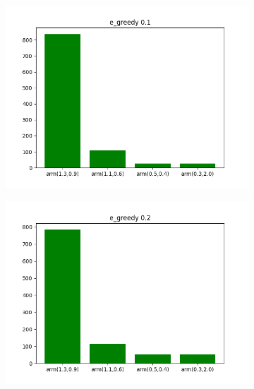 \documentclass[letterpaper]{article}
\begin{document}
\begin{figure}[H]
\begin{subfigure}{.5\textwidth}
    \includegraphics[width=1\linewidth]{images/assign3/ex1/arms_e_greedy01}
    \caption{}
    \label{fig:arms_e_greedy01_ex1}
  \end{subfigure}
  \begin{subfigure}{.5\textwidth}
    \centering
    \includegraphics[width=1\linewidth]{images/assign3/ex1/arms_e_greedy02}
    \caption{}
    \label{fig:arms_e_greedy02_ex1}
  \end{subfigure}
  \begin{subfigure}{.5\textwidth}
    \centering

\end{subfigure}
\end{figure}
\end{document}
